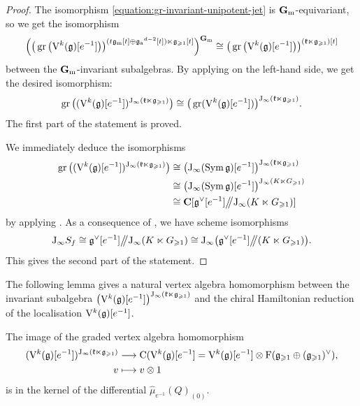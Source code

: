 \begin{proof}
	The isomorphism \eqref{equation:gr-invariant-unipotent-jet} is $\mathbf{G}_\mathrm{m}$-equivariant, so we get the isomorphism
	\[ \Big(\big(\operatorname{gr} \big(\mathrm V^k(\mathfrak g)[e^{-1}]\big)\big)^{(t \mathfrak g_{\mathrm m}[t] \oplus \mathfrak g_{\mathrm a}{}^{d-2} [t]) \ltimes \mathfrak g_{\geqslant 1}[t]}\Big)^{\mathbf{G}_\mathrm{m}} \cong \big(\operatorname{gr} \big(\mathrm V^k(\mathfrak g)[e^{-1}]\big)\big)^{(\mathfrak k \ltimes \mathfrak g_{\geqslant 1})[t]} \]
	between the $\mathbf{G}_\mathrm{m}$-invariant subalgebras. By applying  on the left-hand side, we get the desired isomorphism:
	\[ \operatorname{gr}\big((\mathrm V^k(\mathfrak g)[e^{-1}])^{\mathrm{J}_\infty(\mathfrak k \ltimes \mathfrak g_{\geqslant 1})}\big) \cong \big(\operatorname{gr}(\mathrm V^k(\mathfrak g)[e^{-1}])\big)^{\mathrm{J}_\infty(\mathfrak k \ltimes \mathfrak g_{\geqslant 1})}. \]
	The first part of the statement is proved.
	
	We immediately deduce the isomorphisms 
	\[ \begin{aligned}
		\operatorname{gr}\big((\mathrm V^k(\mathfrak g)[e^{-1}])^{\mathrm{J}_\infty(\mathfrak k \ltimes \mathfrak g_{\geqslant 1})}\big) & \cong \big(\mathrm{J}_\infty(\operatorname{Sym} \mathfrak g)[e^{-1}]\big)^{\mathrm{J}_\infty(\mathfrak k \ltimes \mathfrak g_{\geqslant 1})}  \\
		& \cong  \big(\mathrm{J}_\infty(\operatorname{Sym} \mathfrak g)[e^{-1}]\big)^{\mathrm{J}_\infty(K \ltimes G_{\geqslant 1})} \\
		& \cong \mathbf{C}[\mathfrak g^\vee[e^{-1}] \big/\!\!\big/ \mathrm{J}_\infty(K \ltimes G_{\geqslant 1})]
	\end{aligned} \]	
	by applying . As a consequence of , we have scheme isomorphisms
	\[ \mathrm{J}_\infty S_f \cong \mathfrak g^\vee[e^{-1}] \big/\!\!\big/ \mathrm{J}_\infty(K \ltimes G_{\geqslant 1}) \cong \mathrm{J}_\infty\big(\mathfrak g^\vee[e^{-1}] \big/\!\!\big/ (K \ltimes G_{\geqslant 1})\big).  \]
	This gives the second part of the statement.
\end{proof}

The following lemma gives a natural vertex algebra homomorphism between the invariant subalgebra $\big(\mathrm V^k(\mathfrak g)[e^{-1}]\big)^{\mathrm{J}_\infty(\mathfrak k \ltimes \mathfrak g_{\geqslant 1})}$ and the chiral Hamiltonian reduction of the localisation $\mathrm V^k(\mathfrak g)[e^{-1}]$. 

\begin{lemma} \label{lemma:coset-to-cohomology}
	The image of the graded vertex algebra homomorphism
	\[ \begin{aligned}
		(\mathrm V^k(\mathfrak g)[e^{-1}])^{\mathrm{J}_\infty(\mathfrak k \ltimes \mathfrak g_{\geqslant 1})} & \longrightarrow \mathrm{C}(\mathrm V^k(\mathfrak g)[e^{-1}] = \mathrm V^k(\mathfrak g)[e^{-1}] \otimes \mathrm F(\mathfrak g_{\geqslant 1} \oplus (\mathfrak g_{\geqslant 1})^\vee), \\
		v & \longmapsto v \otimes 1 
	\end{aligned} \]
	is in the kernel of the differential $\widehat\mu_{e^{-1}}(Q)_{(0)}$.
\end{lemma}

